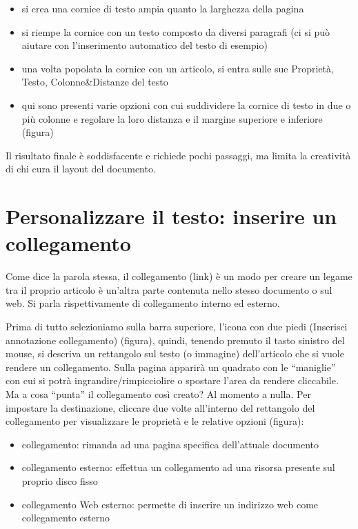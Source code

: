 \documentclass[a4paper, 12pt]{book}
\begin{document}
\begin{itemize}
	\item si crea una cornice di testo ampia quanto la larghezza della pagina

	\item si riempe la cornice con un testo composto da diversi paragrafi (ci si può aiutare con l'inserimento automatico del testo di esempio)
	\item una volta popolata la cornice con un articolo, si entra sulle sue Proprietà, Testo, Colonne\&Distanze del testo
	
	\item qui sono presenti varie opzioni con cui suddividere la cornice di testo in due o più colonne e regolare la loro distanza e il margine superiore e inferiore (figura)
\end{itemize}

Il risultato finale è soddisfacente e richiede pochi passaggi, ma limita la creatività di chi cura il layout del documento.

\section{Personalizzare il testo: inserire un collegamento}
Come dice la parola stessa, il collegamento (link) è un modo per creare un legame tra il proprio articolo è un'altra parte contenuta nello stesso documento o sul web. Si parla rispettivamente di collegamento interno ed esterno. 

Prima di tutto selezioniamo sulla barra superiore, l'icona con due piedi (Inserisci annotazione collegamento) (figura), quindi, tenendo premuto il tasto sinistro del mouse, si descriva un rettangolo sul testo (o immagine)  dell'articolo che si vuole rendere un collegamento. Sulla pagina apparirà un quadrato con le “maniglie” con cui si potrà ingrandire/rimpicciolire o spostare l'area da rendere cliccabile. Ma a cosa “punta” il collegamento così creato? Al momento a nulla. Per impostare la destinazione, cliccare due volte all'interno del rettangolo del collegamento per visualizzare le proprietà e le relative opzioni (figura):

\begin{itemize}
	\item collegamento: rimanda ad una pagina specifica dell'attuale documento

	\item collegamento esterno: effettua un collegamento ad una risorsa presente sul proprio disco fisso

	\item collegamento Web esterno: permette di inserire un indirizzo web come collegamento esterno
\end{itemize}
\end{document}
